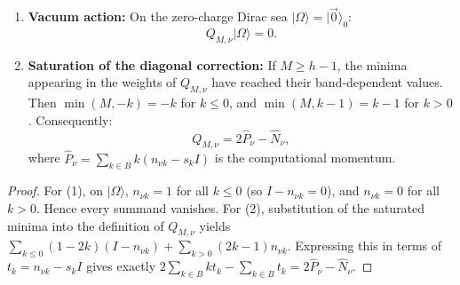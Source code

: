 \begin{lemma}
\label{lem:app_q_properties}
\begin{enumerate}
    \item \textbf{Vacuum action:} On the zero-charge Dirac sea $|\Omega\rangle = |\vec{0}\rangle_0$:
    \begin{equation}
    Q_{M, \nu} |\Omega\rangle = 0.
    \end{equation}
    \item \textbf{Saturation of the diagonal correction:} If $M \ge h - 1$, the minima appearing in the weights of $Q_{M,\nu}$ have reached their band-dependent values. Then $\min(M, -k) = -k$ for $k \le 0$, and $\min(M, k-1) = k-1$ for $k > 0$. Consequently:
    \begin{equation}
    Q_{M, \nu} = 2\hat{P}_\nu - \hat{N}_\nu,
    \end{equation}
    where $\hat{P}_\nu = \sum_{k \in B} k (n_{\nu k} - s_k I)$ is the computational momentum.
\end{enumerate}
\end{lemma}

\begin{proof}
For (1), on $|\Omega\rangle$, $n_{\nu k} = 1$ for all $k \le 0$ (so $I - n_{\nu k} = 0$), and $n_{\nu k} = 0$ for all $k > 0$. Hence every summand vanishes.
For (2), substitution of the saturated minima into the definition of $Q_{M, \nu}$ yields $\sum_{k \le 0} (1 - 2k)(I - n_{\nu k}) + \sum_{k > 0} (2k - 1)n_{\nu k}$. Expressing this in terms of $t_k = n_{\nu k} - s_k I$ gives exactly $2 \sum_{k \in B} k t_k - \sum_{k \in B} t_k = 2\hat{P}_\nu - \hat{N}_\nu$.
\end{proof}
